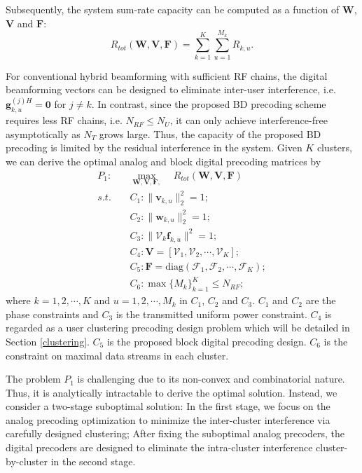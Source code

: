 \documentclass[conference]{IEEEtran}
\begin{document}
{Subsequently, the system sum-rate capacity can be computed as a function of $\bm{W}$, ${\bm V}$ and ${\bm F}$:
\begin{equation}
R_{tot}(\bm{W}, \bm{V}, \bm{F})=\sum_{k=1}^{K}\sum_{u=1}^{M_k}R_{k,u}.
\end{equation}

For conventional hybrid beamforming with sufficient RF chains, the digital beamforming vectors can be designed to eliminate inter-user interference, i.e. ${\bm{g}}^{(j)H}_{k,u}={\bm 0}$ for $j\neq k$. In contrast, since the proposed BD precoding scheme requires less RF chains, i.e. $N_{RF}\leq N_U$, it can only achieve interference-free asymptotically as $N_T$ grows large. Thus, the capacity of the proposed BD precoding is limited by the residual interference in the system. Given $K$ clusters, we can derive the optimal analog and block digital precoding matrices by
\begin{align}\label{eq:maxsumrate}
P_1: \quad&\max_{\bm W, \bm{V},\bm F, }\quad R_{tot}(\bm{W}, \bm{V}, \bm{F})\\ \nonumber
s.t. \quad&C_1: \|\bm{v}_{k,u}\|^2_2=1; \\
&C_2: \|\bm{w}_{k,u}\|^2_2=1;\nonumber\\
&C_3: \|\bm{\mathcal{V}}_k \bm{f}_{k,u}\|^2=1;\nonumber\\
&C_4: \bm{V} = [\bm{\mathcal{V}}_1, \bm{\mathcal{V}}_2, \cdots, \bm{\mathcal{V}}_K];\nonumber\\
&C_5: \bm{F} = \text{diag}(\bm{\mathcal{F}}_1, \bm{\mathcal{F}}_2, \cdots, \bm{\mathcal{F}}_{K});\nonumber\\
&C_6: \max \{M_k\}_{k=1}^K \leq N_{RF};\nonumber
\end{align}
where $k=1,2,\cdots,K$ and $u = 1, 2, \cdots, M_k$ in $C_1$, $C_2$ and $C_3$. $C_1$ and $C_2$ are the phase constraints and $C_3$ is the transmitted uniform power constraint. $C_4$ is regarded as a user clustering precoding design problem which will be detailed in Section \ref{clustering}. $C_5$ is the proposed block digital precoding design. $C_6$ is the constraint on maximal data streams in each cluster.

The problem $P_1$ is challenging due to its non-convex and combinatorial nature. Thus, it is analytically intractable to derive the optimal solution. Instead, we consider a two-stage suboptimal solution: In the first stage, we focus on the analog precoding optimization to minimize the inter-cluster interference via carefully designed clustering; After fixing the suboptimal analog precoders, the digital precoders are designed to eliminate the intra-cluster interference cluster-by-cluster in the second stage.

}
\end{document}
